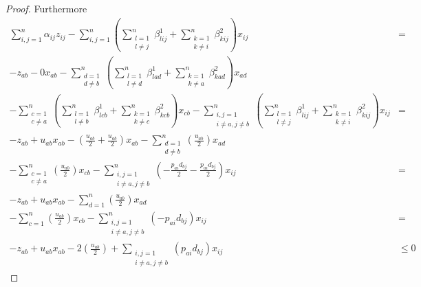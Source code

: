 \begin{proof}
	Furthermore
	\begin{align*}
		\sum_{i,j=1}^n\alpha_{ij}z_{ij} - \sum_{i,j=1}^n \left(\sum_{\substack{l=1\\l\neq j}}^n \beta^1_{lij} + \sum_{\substack{k=1\\k\neq i}}^n\beta^2_{kij}\right)x_{ij} & =\\
		-z_{ab} - 0 x_{ab} - \sum_{\substack{d=1\\d\neq b}}^n\left(\sum_{\substack{l=1\\l\neq d}}^n \beta^1_{lad} + \sum_{\substack{k=1\\k\neq a}}^n\beta^2_{kad}\right)x_{ad}&\\
		- \sum_{\substack{c=1\\c\neq a}}^n\left(\sum_{\substack{l=1\\l\neq b}}^n \beta^1_{lcb} + \sum_{\substack{k=1\\k\neq c}}^n\beta^2_{kcb}\right)x_{cb} - \sum_{\substack{i,j=1\\i\neq a, j\neq b}}^n\left(\sum_{\substack{l=1\\l\neq j}}^n \beta^1_{lij} + \sum_{\substack{k=1\\k\neq i}}^n\beta^2_{kij}\right)x_{ij}&=\\
		-z_{ab} + u_{ab}x_{ab} -\left(\frac{u_{ab}}{2}+\frac{u_{ab}}{2}\right)x_{ab}- \sum_{\substack{d=1\\d\neq b}}^n\left(\frac{u_{ab}}{2}\right)x_{ad}&\\
		 - \sum_{\substack{c=1\\c\neq a}}^n\left(\frac{u_{ab}}{2}\right)x_{cb} - \sum_{\substack{i,j=1\\i\neq a, j\neq b}}^n\left(-\frac{p_{ai}d_{bj}}{2}-\frac{p_{ai}d_{bj}}{2}\right)x_{ij}&=\\
		-z_{ab} + u_{ab}x_{ab} - \sum_{d=1}^n\left(\frac{u_{ab}}{2}\right)x_{ad}&\\
		 - \sum_{c=1}^n\left(\frac{u_{ab}}{2}\right)x_{cb} - \sum_{\substack{i,j=1\\i\neq a, j\neq b}}^n\left(-p_{ai}d_{bj}\right)x_{ij}&=\\
		-z_{ab}+u_{ab}x_{ab} - 2\left(\frac{u_{ab}}{2}\right)+\sum_{\substack{i,j=1\\i\neq a, j\neq b}}\left(p_{ai}d_{bj}\right)x_{ij}&\leq 0
	\end{align*}
\end{proof}

